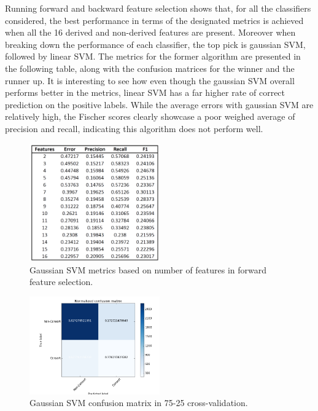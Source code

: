 \documentclass[twoside,twocolumn,paper=letter]{article}
\begin{document}
Running forward and backward feature selection shows that, for all the classifiers considered, the best performance in terms of the designated metrics is achieved when all the 16 derived and non-derived features are present. Moreover when breaking down the performance of each classifier, the top pick is gaussian SVM, followed by linear SVM. The metrics for the former algorithm are presented in the following table, along with the confusion matrices for the winner and the runner up. It is interesting to see how even though the gaussian SVM overall performs better in the metrics, linear SVM has a far higher rate of correct prediction on the positive labels. While the average errors with gaussian SVM are relatively high, the Fischer scores clearly showcase a poor weighed average of precision and recall, indicating this algorithm does not perform well.\\
\begin{figure}
      \centering
          \includegraphics[width=0.5\textwidth]{../figs/ClassificationMetrics_RbfSVM.png}
  \caption{Gaussian SVM metrics based on number of features in forward feature selection.}
  \label{fig:rbf_svm_vis}
\end{figure}
\begin{figure}
      \centering
          \includegraphics[width=0.5\textwidth]{../figs/gaussianSVM_CM.png}
  \caption{Gaussian SVM confusion matrix in 75-25 cross-validation.}
  \label{fig:cm_rbf_vis}
\end{figure}
\end{document}
